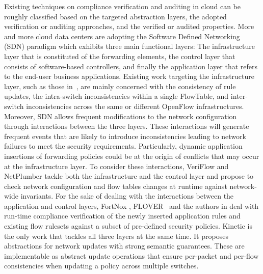 \documentclass[12pt]{article}
\begin{document}
Existing techniques on compliance verification and auditing in cloud
can be roughly classified based on the targeted abstraction layers,
the adopted verification or auditing approaches, and the verified or
audited properties. More and more cloud data centers are adopting the
Software Defined Networking (SDN) paradigm which exhibits three main
functional layers: The infrastructure layer that is constituted of the
forwarding elements, the control layer that consists of software-based
controllers, and finally the application layer that refers to the
end-user business applications. Existing work targeting the
infrastructure layer, such as those
in~\cite{Al-Shaer:2010:FCA:1866898.1866905,McGeer:2012:SEU:2342441.2342454,Mai:2011:DDP:2043164.2018470},
are mainly concerned with the consistency of rule updates, the
intra-switch inconsistencies within a single FlowTable, and
inter-switch inconsistencies across the same or different OpenFlow
infrastructures.  Moreover, SDN allows frequent modifications to the
network configuration through interactions between the three
layers. These interactions will generate frequent events that are
likely to introduce inconsistencies leading to network failures to
meet the security requirements. Particularly, dynamic application
insertions of forwarding policies could be at the origin of conflicts
that may occur at the infrastructure layer.  To consider these
interactions, VeriFlow \cite{Khurshid:2012:VVN:2342441.2342452} and
NetPlumber \cite{Kazemian:2013:RTN:2482626.2482638} tackle both the
infrastructure and the control layer and propose to check network
configuration and flow tables changes at runtime against network-wide
invariants. For the sake of dealing with the interactions between the
application and control layers, FortNox
\cite{Porras:2012:SEK:2342441.2342466}, FLOVER~\cite{FLOVERICC13} and
the authors in \cite{Wang2013} deal with run-time compliance
verification of the newly inserted application rules and existing flow
rulesets against a subset of pre-defined security policies.  Kinetic
\cite{Reitblatt:2011:CUS:2070562.2070569} is the only work that
tackles all three layers at the same time. It proposes abstractions
for network updates with strong semantic guarantees. These are
implementable as abstract update operations that ensure per-packet and
per-flow consistencies when updating a policy across multiple
switches.
\end{document}
